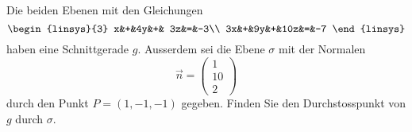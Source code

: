 %
%
%
%
%
%
%
Die beiden Ebenen mit den Gleichungen
\[
\begin{linsys}{3}
 x&+&4y&+& 3z&=&-3\\
3x&+&9y&+&10z&=&-7
\end{linsys}
\]
haben eine Schnittgerade $g$.
Ausserdem sei die Ebene $\sigma$ mit der Normalen
\[
\vec n=
\begin{pmatrix}1\\10\\2\end{pmatrix}
\]
durch den Punkt $P=(1,-1,-1)$ gegeben. Finden Sie den Durchstosspunkt
von $g$ durch $\sigma$.


